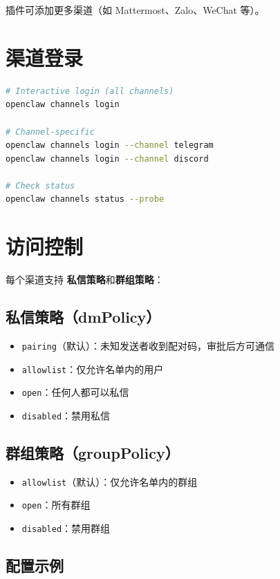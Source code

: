 插件可添加更多渠道（如 Mattermost、Zalo、WeChat 等）。

\section{渠道登录}

\begin{lstlisting}[language=bash]
# Interactive login (all channels)
openclaw channels login

# Channel-specific
openclaw channels login --channel telegram
openclaw channels login --channel discord

# Check status
openclaw channels status --probe
\end{lstlisting}

\section{访问控制}

每个渠道支持 \textbf{私信策略}和\textbf{群组策略}：

\subsection{私信策略（dmPolicy）}

\begin{itemize}
  \item \texttt{pairing}（默认）：未知发送者收到配对码，审批后方可通信
  \item \texttt{allowlist}：仅允许名单内的用户
  \item \texttt{open}：任何人都可以私信
  \item \texttt{disabled}：禁用私信
\end{itemize}

\subsection{群组策略（groupPolicy）}

\begin{itemize}
  \item \texttt{allowlist}（默认）：仅允许名单内的群组
  \item \texttt{open}：所有群组
  \item \texttt{disabled}：禁用群组
\end{itemize}

\subsection{配置示例}

